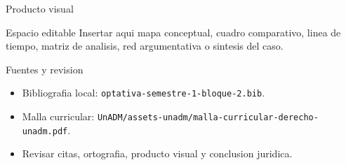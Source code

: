 \documentclass[
  spanish,
  aspectratio=169,
  xcolor={dvipsnames,table}
]{beamer}
\begin{document}
\begin{frame}{Producto visual}
  \begin{block}{Espacio editable}
    Insertar aqui mapa conceptual, cuadro comparativo, linea de tiempo,
    matriz de analisis, red argumentativa o sintesis del caso.
  \end{block}
  \centering
\end{frame}

\begin{frame}{Fuentes y revision}
  \begin{itemize}
    \item Bibliografia local: \texttt{optativa-semestre-1-bloque-2.bib}.
    \item Malla curricular: \texttt{UnADM/assets-unadm/malla-curricular-derecho-unadm.pdf}.
    \item Revisar citas, ortografia, producto visual y conclusion juridica.
  \end{itemize}
\end{frame}
\end{document}
